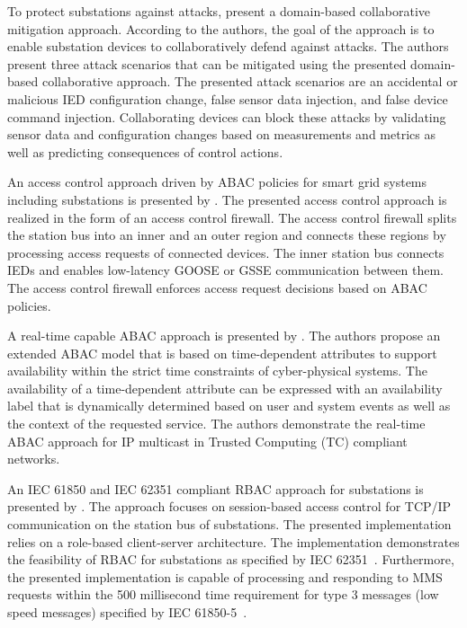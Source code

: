 To protect substations against attacks, \citeauthor{Hong2019} \cite{Hong2019} present a domain-based collaborative mitigation approach.
According to the authors, the goal of the approach is to enable substation devices to collaboratively defend against attacks.
The authors present three attack scenarios that can be mitigated using the presented domain-based collaborative approach.
The presented attack scenarios are an accidental or malicious IED configuration change, false sensor data injection, and false device command injection.
Collaborating devices can block these attacks by validating sensor data and configuration changes based on measurements and metrics as well as predicting consequences of control actions.

An access control approach driven by ABAC policies for smart grid systems including substations is presented by \citeauthor{Ruland2018} \cite{Ruland2018}.
The presented access control approach is realized in the form of an access control firewall.
The access control firewall splits the station bus into an inner and an outer region and connects these regions by processing access requests of connected devices.
The inner station bus connects IEDs and enables low-latency GOOSE or GSSE communication between them.
The access control firewall enforces access request decisions based on ABAC policies.

A real-time capable ABAC approach is presented by \citeauthor{Burmester2013} \cite{Burmester2013}.
The authors propose an extended ABAC model that is based on time-dependent attributes to support availability within the strict time constraints of cyber-physical systems.
The availability of a time-dependent attribute can be expressed with an availability label that is dynamically determined based on user and system events as well as the context of the requested service.
The authors demonstrate the real-time ABAC approach for IP multicast in Trusted Computing (TC) compliant networks.

An IEC 61850 and IEC 62351 compliant RBAC approach for substations is presented by \citeauthor{Lee2015} \cite{Lee2015}.
The approach focuses on session-based access control for TCP/IP communication on the station bus of substations.
The presented implementation relies on a role-based client-server architecture.
The implementation demonstrates the feasibility of RBAC for substations as specified by IEC 62351~\cite{IEC62351P8}.
Furthermore, the presented implementation is capable of processing and responding to MMS requests within the 500 millisecond time requirement for type 3 messages (low speed messages) specified by IEC 61850-5~\cite{IEC61850P5}.

